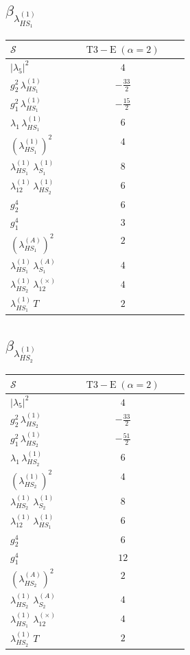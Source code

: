\documentclass[9pt]{article}
\begin{document}
\subsection*{$ \beta_{\lambda_{HS_1}^{(1)}} $}
\begin{longtable}{@{}p{0.31\linewidth}c@{}}
\toprule
$\mathcal{S}$ & $ \mathrm{T3-E}\;(\alpha=2) $ \\
\midrule
$ |\lambda_5|^2 $ & $ 4 $ \\
$ g_2^2\,\lambda_{HS_1}^{(1)} $ & $ - \frac{33}{2} $ \\
$ g_1^2\,\lambda_{HS_1}^{(1)} $ & $ - \frac{15}{2} $ \\
$ \lambda_1\,\lambda_{HS_1}^{(1)} $ & $ 6 $ \\
$ \left(\lambda_{HS_1}^{(1)}\right)^2 $ & $ 4 $ \\
$ \lambda_{HS_1}^{(1)}\,\lambda_{S_1}^{(1)} $ & $ 8 $ \\
$ \lambda_{12}^{(1)}\,\lambda_{HS_2}^{(1)} $ & $ 6 $ \\
$ g_2^4 $ & $ 6 $ \\
$ g_1^4 $ & $ 3 $ \\
$ \left(\lambda_{HS_1}^{(A)}\right)^2 $ & $ 2 $ \\
$ \lambda_{HS_1}^{(1)}\,\lambda_{S_1}^{(A)} $ & $ 4 $ \\
$ \lambda_{HS_2}^{(1)}\,\lambda_{12}^{(\times)} $ & $ 4 $ \\
$ \lambda_{HS_1}^{(1)}\,T $ & $ 2 $ \\
\bottomrule
\end{longtable}
\subsection*{$ \beta_{\lambda_{HS_2}^{(1)}} $}
\begin{longtable}{@{}p{0.31\linewidth}c@{}}
\toprule
$\mathcal{S}$ & $ \mathrm{T3-E}\;(\alpha=2) $ \\
\midrule
$ |\lambda_5|^2 $ & $ 4 $ \\
$ g_2^2\,\lambda_{HS_2}^{(1)} $ & $ - \frac{33}{2} $ \\
$ g_1^2\,\lambda_{HS_2}^{(1)} $ & $ - \frac{51}{2} $ \\
$ \lambda_1\,\lambda_{HS_2}^{(1)} $ & $ 6 $ \\
$ \left(\lambda_{HS_2}^{(1)}\right)^2 $ & $ 4 $ \\
$ \lambda_{HS_2}^{(1)}\,\lambda_{S_2}^{(1)} $ & $ 8 $ \\
$ \lambda_{12}^{(1)}\,\lambda_{HS_1}^{(1)} $ & $ 6 $ \\
$ g_2^4 $ & $ 6 $ \\
$ g_1^4 $ & $ 12 $ \\
$ \left(\lambda_{HS_2}^{(A)}\right)^2 $ & $ 2 $ \\
$ \lambda_{HS_2}^{(1)}\,\lambda_{S_2}^{(A)} $ & $ 4 $ \\
$ \lambda_{HS_1}^{(1)}\,\lambda_{12}^{(\times)} $ & $ 4 $ \\
$ \lambda_{HS_2}^{(1)}\,T $ & $ 2 $ \\
\bottomrule
\end{longtable}
\end{document}
